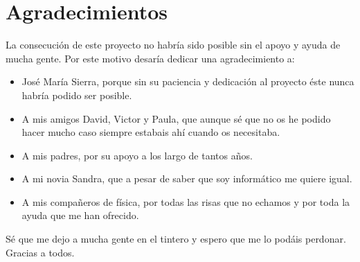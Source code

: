 \chapter{Agradecimientos} 

La consecución de este proyecto no habría sido posible sin el apoyo y ayuda de mucha gente. Por este motivo desaría dedicar una agradecimiento a:

\begin{itemize}

	\item José María Sierra, porque sin su paciencia y dedicación al proyecto éste nunca habría podido ser posible.
	
	\item A mis amigos David, Victor y Paula, que aunque sé que no os he podido hacer mucho caso siempre estabais ahí cuando os necesitaba.
	
	\item A mis padres, por su apoyo a los largo de tantos años.
	
	\item A mi novia Sandra, que a pesar de saber que soy informático me quiere igual.
	
	\item A mis compañeros de física, por todas las risas que no echamos y por toda la ayuda que me han ofrecido.

\end{itemize}

Sé que me dejo a mucha gente en el tintero y espero que me lo podáis perdonar. Gracias a todos.